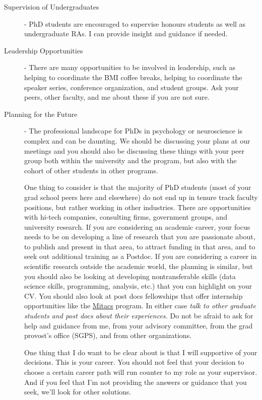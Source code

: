 \documentclass{article}
\begin{document}
\begin{description}
\item [Supervision of Undergraduates] - PhD students are encouraged to supervise honours students as well as undergraduate RAs. I can provide insight and guidance if needed.

\item [Leadership Opportunities] - There are many opportunities to be involved in leadership, such as helping to coordinate the BMI coffee breaks, helping to coordinate the speaker series, conference organization, and student groups. Ask your peers, other faculty, and me about these if you are not sure. 

\item [Planning for the Future] - The professional landscape for PhDs in psychology or neuroscience is complex and can be daunting. We should be discussing your plans at our meetings and you should also be discussing these things with your peer group both within the university and the program, but also with the cohort of other students in other programs.

One thing to consider is that the majority of PhD students (most of your grad school peers here and elsewhere) do not end up in tenure track faculty positions, but rather working in other industries. There are opportunities with hi-tech companies, consulting firms, government groups, and university research. If you are considering an academic career, your focus needs to be on developing a line of research that you are passionate about, to publish and present in that area, to attract funding in that area, and to seek out additional training as a Postdoc. If you are considering a career in scientific research outside the academic world, the planning is similar, but you should also be looking at developing nontransferable skills (data science skills, programming, analysis, etc.) that you can highlight on your CV. You should also look at post docs fellowships that offer internship opportunities like the \href{https://www.mitacs.ca/en}{Mitacs} program. In either case \textit{talk to other graduate students and post docs about their experiences.} Do not be afraid to ask for help and guidance from me, from your advisory committee, from the grad provost's office (SGPS), and from other organizations.  

One thing that I do want to be clear about is that I will supportive of your decisions. This is your career. You should not feel that your decision to choose a certain career path will run counter to my role as your supervisor. And if you feel that I'm not providing the answers or guidance that you seek, we'll look for other solutions. 


\end{description}
\end{document}
